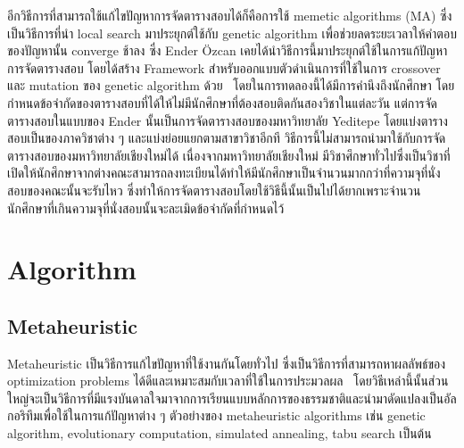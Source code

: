 อีกวิธีการที่สามารถใช้แก้ไขปัญหาการจัดตารางสอบได้ก็คือการใช้ memetic algorithms (MA) ซึ่งเป็นวิธีการที่นำ local search มาประยุกต์ใช้กับ genetic algorithm 
เพื่อช่วยลดระยะเวลาให้คำตอบของปัญหานั้น converge ช้าลง \cite{pablo-memetic-algo} ซึ่ง Ender {\"O}zcan เคยได้นำวิธีการนี้มาประยุกต์ใช้ในการแก้ปัญหาการจัดตารางสอบ 
โดยได้สร้าง Framework สำหรับออกแบบตัวดำเนินการที่ใช้ในการ crossover และ mutation ของ genetic algorithm ด้วย~\cite{fes}
โดยในการทดลองนี้ได้มีการคำนึงถึงนักศึกษา โดยกำหนดข้อจำกัดของตารางสอบที่ได้ให้ไม่มีนักศึกษาที่ต้องสอบติดกันสองวิชาในแต่ละวัน แต่การจัดตารางสอบในแบบของ Ender 
นั้นเป็นการจัดตารางสอบของมหาวิทยาลัย Yeditepe โดยแบ่งตารางสอบเป็นของภาควิชาต่าง ๆ และแบ่งย่อยแยกตามสาขาวิชาอีกที วิธีการนี้ไม่สามารถนำมาใช้กับการจัดตารางสอบของมหาวิทยาลัยเชียงใหม่ได้
เนื่องจากมหาวิทยาลัยเชียงใหม่ มีวิชาศึกษาทั่วไปซึ่งเป็นวิชาที่เปิดให้นักศึกษาจากต่างคณะสามารถลงทะเบียนได้ทำให้มีนักศึกษาเป็นจำนวนมากกว่าที่ความจุที่นั่งสอบของคณะนั้นจะรับไหว
ซึ่งทำให้การจัดตารางสอบโดยใช้วิธีนี้นั้นเป็นไปได้ยากเพราะจำนวนนักศึกษาที่เกินความจุที่นั่งสอบนั้นจะละเมิดข้อจำกัดที่กำหนดไว้ 

\iffalse
\section{Tools}
\subsection{Gurobi Optimizer}
Gurobi Optimizer เป็น Solver ที่ใช้สำหรับแก้ปัญหา optimization โดยที่จะเน้นไปทางด้านของปัญหาต่าง ๆ ดังนี้ 
\begin{itemize}
  \item Linear programming (LP)
  \item Mixed-integer linear programming (MILP)
  \item Quadratic programming (QP)
  \item Mixed-integer quadratic programming (MIQP)
  \item Quadratically-constrained programming (QCP)
  \item Mixed-integer quadratically-constrained programming (MIQCP)
\end{itemize}
ผลลัพธ์ที่ได้จาก Gurobi Optimizer อาจนำมาใช้เป็นตัวเปรียบเทียบประสิทธิภาพกับผลลัพธ์การทำงานที่ได้จากอัลกอลิทึมของเรา
\fi
\section{Algorithm}
\subsection{Metaheuristic}
Meta­heuristic เป็นวิธีการแก้ไขปัญหาที่ใช้งานกันโดยทั่วไป ซึ่งเป็นวิธีการที่สามารถหาผลลัพธ์ของ optimization problems ได้ดีและเหมาะสมกับเวลาที่ใช้ในการประมวลผล~\cite{metaheuris}
โดยวิธีเหล่านี้นั้นส่วนใหญ่จะเป็นวิธีการที่มีแรงบันดาลใจมาจากการเรียนแบบหลักการของธรรมชาติและนำมาดัดแปลงเป็นอัลกอริทึมเพื่อใช้ในการแก้ปัญหาต่าง ๆ ตัวอย่างของ metaheuristic algorithms เช่น genetic algorithm, evolutionary computation, simulated annealing, tabu search เป็นต้น

